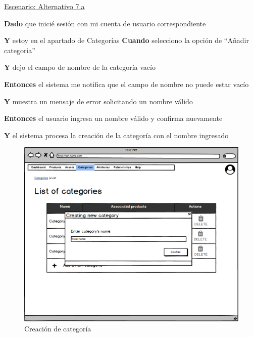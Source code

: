 \vspace{0.20cm}

\underline{Escenario: Alternativo 7.a}\par
\vspace{0.15cm}

\textbf{Dado} que inicié sesión con mi cuenta de usuario correspondiente\par
\textbf{Y} estoy en el apartado de Categorías
\textbf{Cuando} selecciono la opción de “Añadir categoría”\par
\textbf{Y} dejo el campo de nombre de la categoría vacío\par
\textbf{Entonces} el sistema me notifica que el campo de nombre no puede estar vacío\par
\textbf{Y} muestra un mensaje de error solicitando un nombre válido\par
\textbf{Entonces} el usuario ingresa un nombre válido y confirma nuevamente\par
\textbf{Y} el sistema procesa la creación de la categoría con el nombre ingresado\par


\vspace{0.20cm}

\begin{figure}[H]
    \includegraphics[width=1\linewidth]{mockups/RF4.1_1.png}
    \caption{Creación de categoría}
   \end{figure}
\vspace{1.0cm}

